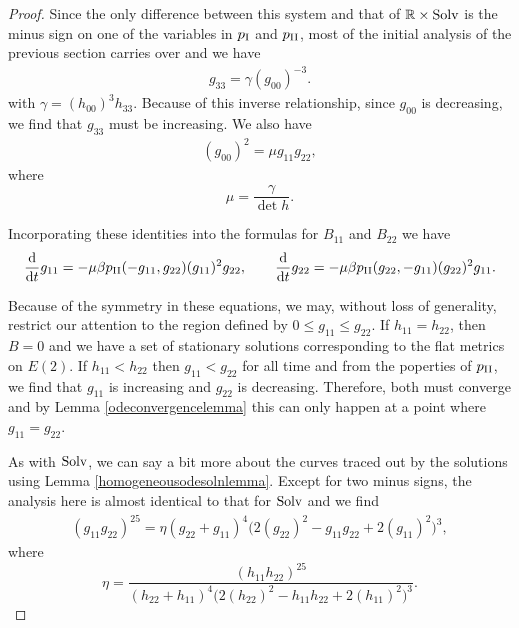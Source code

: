 \documentclass[pdftex]{sigma}
\numberwithin{equation}{section}
\newcommand{\dtime}{\frac{{\rm d}}{{\rm d} t}} %
\begin{document}
\begin{proof}
Since the only difference between this system and that of $\mathbb{R} \times {\rm Solv}$ is the minus sign on one of the variables in $p_{\rm I}$ and $p_{\rm II}$, most of the initial analysis of the previous section carries over and we have
\begin{gather} \label{e2g33eqn}
g_{33} = \gamma (g_{00})^{-3}.
\end{gather}
with $\gamma = (h_{00})^3 h_{33}$. Because of this inverse relationship, since $g_{00}$ is decreasing, we find that $g_{33}$ must be increasing. We also have
\begin{gather} \label{e2g00eqn}
(g_{00})^2 = \mu g_{11} g_{22},
\end{gather}
where
\[
\mu = \frac{\gamma}{\det h}.
\]

Incorporating these identities into the formulas for $B_{11}$ and $B_{22}$ we have
\begin{gather*}
\dtime g_{11} = -\mu \beta p_{\rm II}(-g_{11}, g_{22}) (g_{11})^2 g_{22}, \qquad
\dtime g_{22} = -\mu \beta p_{\rm II}(g_{22}, -g_{11}) (g_{22})^2 g_{11}.
\end{gather*}

Because of the symmetry in these equations, we may, without loss of generality, restrict our attention to the region defined by $0 \leq g_{11} \leq g_{22}$. If $h_{11} = h_{22}$, then $B = 0$ and we have a set of stationary solutions corresponding to the flat metrics on $E(2)$. If $h_{11} < h_{22}$ then $g_{11} < g_{22}$ for all time and from the poperties of $p_{\rm II}$, we find that $g_{11}$ is increasing and $g_{22}$ is decreasing. Therefore, both must converge and by Lemma \ref{odeconvergencelemma} this can only happen at a point where $g_{11} = g_{22}$.

As with ${\rm Solv}$, we can say a bit more about the curves traced out by the solutions using Lemma \ref{homogeneousodesolnlemma}. Except for two minus signs, the analysis here is almost identical to that for ${\rm Solv}$ and we find
\begin{gather} \label{e2curveeqn}
(g_{11} g_{22})^{25} = \eta (g_{22}+g_{11})^{4} \big(2(g_{22})^2 - g_{11} g_{22} + 2(g_{11})^2\big)^{3},
\end{gather}
where
\[
\eta = \frac{(h_{11} h_{22})^{25}}{(h_{22}+h_{11})^{4}
				\big(2(h_{22})^2 - h_{11} h_{22} + 2(h_{11})^2\big)^{3}}.
\]


\end{proof}
\end{document}
